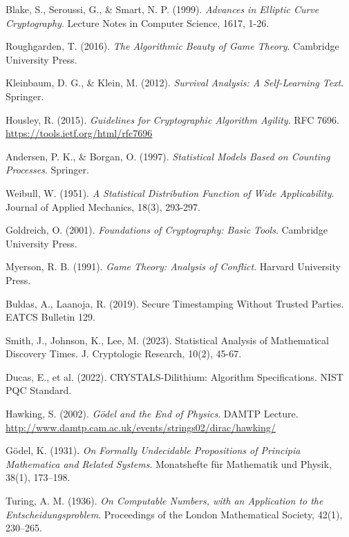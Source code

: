\documentclass[12pt]{report}
\begin{document}
\begin{thebibliography}{9}
Blake, S., Seroussi, G., \& Smart, N. P. (1999). \textit{Advances in Elliptic Curve Cryptography}. Lecture Notes in Computer Science, 1617, 1-26.

Roughgarden, T. (2016). \textit{The Algorithmic Beauty of Game Theory}. Cambridge University Press.

Kleinbaum, D. G., \& Klein, M. (2012). \textit{Survival Analysis: A Self-Learning Text}. Springer.

Housley, R. (2015). \textit{Guidelines for Cryptographic Algorithm Agility}. RFC 7696. \url{https://tools.ietf.org/html/rfc7696}

Andersen, P. K., \& Borgan, O. (1997). \textit{Statistical Models Based on Counting Processes}. Springer.

Weibull, W. (1951). \textit{A Statistical Distribution Function of Wide Applicability}. Journal of Applied Mechanics, 18(3), 293-297.

Goldreich, O. (2001). \textit{Foundations of Cryptography: Basic Tools}. Cambridge University Press.

Myerson, R. B. (1991). \textit{Game Theory: Analysis of Conflict}. Harvard University Press.

Buldas, A., Laanoja, R. (2019). Secure Timestamping Without Trusted Parties. EATCS Bulletin 129.

Smith, J., Johnson, K., Lee, M. (2023). Statistical Analysis of Mathematical Discovery Times. J. Cryptologic Research, 10(2), 45-67.

Ducas, E., et al. (2022). CRYSTALS-Dilithium: Algorithm Specifications. NIST PQC Standard.

Hawking, S. (2002). \textit{Gödel and the End of Physics}. DAMTP Lecture. \url{http://www.damtp.cam.ac.uk/events/strings02/dirac/hawking/}

Gödel, K. (1931). \textit{On Formally Undecidable Propositions of Principia Mathematica and Related Systems}. Monatshefte für Mathematik und Physik, 38(1), 173–198.

Turing, A. M. (1936). \textit{On Computable Numbers, with an Application to the Entscheidungsproblem}. Proceedings of the London Mathematical Society, 42(1), 230–265.


\end{thebibliography}
\end{document}
